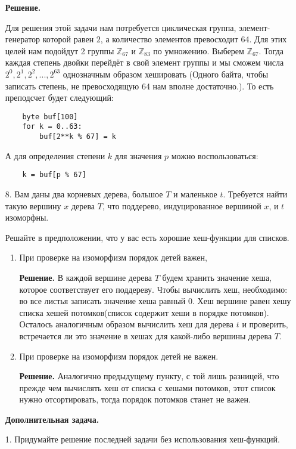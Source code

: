 \begin{enumerate}
	\textbf{Решение.}
	
	Для решения этой задачи нам потребуется циклическая группа, элемент-генератор которой равен $2$, а количество 
	элементов превосходит 64. Для этих целей нам подойдут 2 группы $\mathbb{Z}_{67}$ и $\mathbb{Z}_{83}$ по 
	умножению. Выберем $\mathbb{Z}_{67}$. Тогда каждая степень двойки перейдёт в свой элемент группы и мы сможем 
	числа $2^0, 2^1, 2^2, ..., 2^{63}$ однозначным образом хешировать (Одного байта, чтобы записать степень, не превосходящую 64 нам вполне достаточно.). То есть преподсчет будет следующий:
	\begin{lstlisting}
	byte buf[100]
	for k = 0..63:
		buf[2**k % 67] = k
	\end{lstlisting}
	А для определения степени $k$ для значения $p$ можно воспользоваться:
	\begin{lstlisting}
	k = buf[p % 67]
	\end{lstlisting}
	
	\item[8.] Вам даны два корневых дерева, большое $T$ и маленькое $t$. Требуется найти такую вершину $x$
	дерева $T$, что поддерево, индуцированное вершиной $x$, и $t$ изоморфны.
	
	Решайте в предположении, что у вас есть хорошие хеш-функции для списков.
	
	\begin{enumerate}
		\item При проверке на изоморфизм порядок детей важен,
		
		\textbf{Решение.} В каждой вершине дерева $T$ будем хранить значение хеша, которое соответствует его 
		поддереву. Чтобы вычислить хеш, необходимо: во все листья записать значение хеша равный $0$. Хеш вершине 
		равен хешу списка хешей потомков(список содержит хеши в порядке потомков). Осталось аналогичным образом 
		вычислить хеш для дерева $t$ и проверить, встречается ли это значение в хешах для какой-либо вершины 
		дерева $T$. 
		
		\item При проверке на изоморфизм порядок детей не важен.
		
		\textbf{Решение.} Аналогично предыдущему пункту, с той лишь разницей, что прежде чем вычислять хеш от 
		списка с хешами потомков, этот список нужно отсортировать, тогда порядок потомков станет не важен. 
	\end{enumerate}
	
	\textbf{Дополнительная задача.}
	
	\item[1.] Придумайте решение последней задачи без использования хеш-функций.
	

\end{enumerate}
